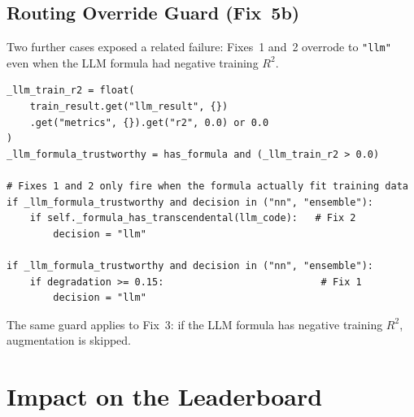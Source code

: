 \documentclass[twoside,11pt]{article}
\begin{document}
\subsection{Routing Override Guard (Fix~5b)}

Two further cases exposed a related failure: Fixes~1 and~2 overrode to
\texttt{"llm"} even when the LLM formula had negative training $R^2$.

\begin{lstlisting}[caption={LLM-formula trustworthiness guard.}]
_llm_train_r2 = float(
    train_result.get("llm_result", {})
    .get("metrics", {}).get("r2", 0.0) or 0.0
)
_llm_formula_trustworthy = has_formula and (_llm_train_r2 > 0.0)

# Fixes 1 and 2 only fire when the formula actually fit training data
if _llm_formula_trustworthy and decision in ("nn", "ensemble"):
    if self._formula_has_transcendental(llm_code):   # Fix 2
        decision = "llm"

if _llm_formula_trustworthy and decision in ("nn", "ensemble"):
    if degradation >= 0.15:                           # Fix 1
        decision = "llm"
\end{lstlisting}

The same guard applies to Fix~3: if the LLM formula has negative training
$R^2$, augmentation is skipped.


\section{Impact on the Leaderboard}
\label{sec:leaderboard}
\end{document}
